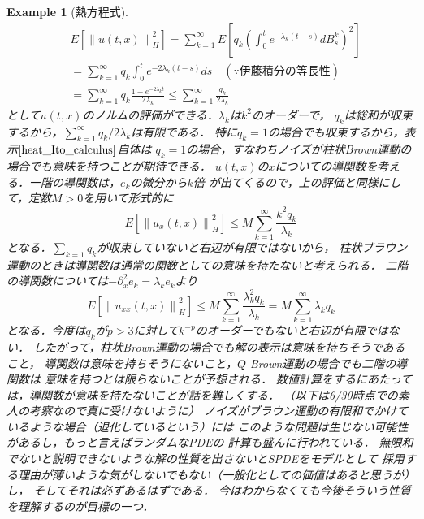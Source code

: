 \documentclass[dvipdfmx,autodetect-engine]{jsarticle}
\newtheorem{example}{Example}[section]
\theoremstyle{remark}
\theoremstyle{definition}
\newcommand{\norm}[1]{\left\lVert#1\right\rVert}
\newcommand{\paren}[1]{\left( #1 \right)}
\begin{document}
\begin{example}[熱方程式]
\begin{align}
        &E[\norm{u(t,x)}_{H}^{2}] = \sum_{k=1}^{\infty} E\left[
            q_{k} \paren{
                \int_{0}^{t} e^{-\lambda_{k}(t-s)} dB_{s}^{k}
            }^{2}
        \right]\\
        &= \sum_{k=1}^{\infty} q_{k} \int_{0}^{t} e^{-2\lambda_{k}(t-s)}ds
        \quad (\because \text{伊藤積分の等長性})\\
        &= \sum_{k=1}^{\infty} q_{k} \frac{1 - e^{-2\lambda_{k}t}}{2\lambda_{k}}
        \leq \sum_{k=1}^{\infty}  \frac{q_{k}}{2\lambda_{k}}
    \end{align}
    として$u(t,x)$のノルムの評価ができる．$\lambda_{k}$は$k^2$のオーダーで，
    $q_{k}$は総和が収束するから，$\sum_{k=1}^{\infty}  q_{k} / 2\lambda_{k}$は有限である．
    特に$q_{k}=1$の場合でも収束するから，表示$\eqref{heat_Ito_calculus}$自体は
    $q_{k}=1$の場合，すなわちノイズが柱状Brown運動の場合でも意味を持つことが期待できる．
    $u(t,x)$の$x$についての導関数を考える．一階の導関数は，$e_{k}$の微分から$k$倍
    が出てくるので，上の評価と同様にして，定数$M>0$を用いて形式的に
    \begin{equation}
        E[\norm{u_{x}(t,x)}_{H}^{2}] \leq M \sum_{k=1}^{\infty} \frac{k^{2}q_{k}}{\lambda_{k}}
    \end{equation}
    となる．$\sum_{k=1}q_{k}$が収束していないと右辺が有限ではないから，
    柱状ブラウン運動のときは導関数は通常の関数としての意味を持たないと考えられる．
    二階の導関数については$-\partial_{x}^{2} e_{k} = \lambda_{k} e_{k}$より
    \begin{equation}
        E[\norm{u_{xx}(t,x)}_{H}^{2}] \leq
         M \sum_{k=1}^{\infty} \frac{\lambda_{k}^{2}q_{k}}{\lambda_{k}}
         = M\sum_{k=1}^{\infty} \lambda_{k} q_{k}
    \end{equation}
    となる．今度は$q_{k}$が$p>3$に対して$k^{-p}$のオーダーでもないと右辺が有限ではない．
    したがって，柱状Brown運動の場合でも解の表示は意味を持ちそうであること，
    導関数は意味を持ちそうにないこと，$Q$-Brown運動の場合でも二階の導関数は
    意味を持つとは限らないことが予想される．
    数値計算をするにあたっては，導関数が意味を持たないことが話を難しくする．
    （以下は6/30時点での素人の考察なので真に受けないように）
    ノイズがブラウン運動の有限和でかけているような場合（退化しているという）には
    このような問題は生じない可能性があるし，もっと言えばランダムなPDEの
    計算も盛んに行われている．
    無限和でないと説明できないような解の性質を出さないとSPDEをモデルとして
    採用する理由が薄いような気がしないでもない（一般化としての価値はあると思うが）し，
    そしてそれは必ずあるはずである．
    今はわからなくても今後そういう性質を理解するのが目標の一つ．
\end{example}
\end{document}
